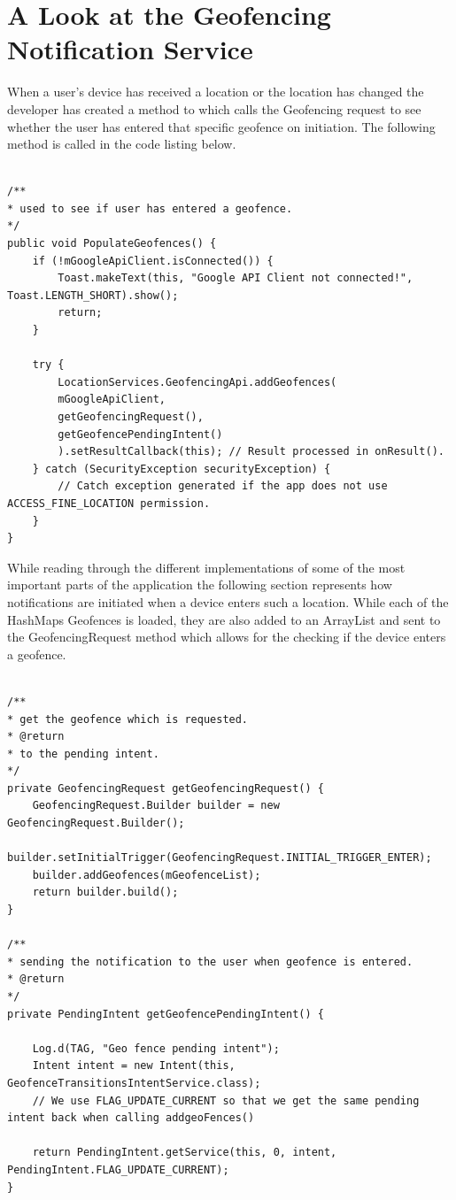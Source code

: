 \section{A Look at the Geofencing Notification Service}
When a user's device has received a location or the location has changed the developer has created a method to which calls the Geofencing request to see whether the user has entered that specific geofence on initiation. The following method is called in the code listing below.
\begin{lstlisting}[style=myCustomMatlabStyle, basicstyle=\small, breaklines, caption=Population of Geofences,captionpos=b]

/**
* used to see if user has entered a geofence.
*/
public void PopulateGeofences() {
    if (!mGoogleApiClient.isConnected()) {
        Toast.makeText(this, "Google API Client not connected!", Toast.LENGTH_SHORT).show();
        return;
    }
    
    try {
        LocationServices.GeofencingApi.addGeofences(
        mGoogleApiClient,
        getGeofencingRequest(),
        getGeofencePendingIntent()
        ).setResultCallback(this); // Result processed in onResult().
    } catch (SecurityException securityException) {
        // Catch exception generated if the app does not use ACCESS_FINE_LOCATION permission.
    }
}
\end{lstlisting}

While reading through the different implementations of some of the most important parts of the application the following section represents how notifications are initiated when a device enters such a location. While each of the HashMaps Geofences is loaded, they are also added to an ArrayList and sent to the GeofencingRequest method which allows for the checking if the device enters a geofence.

\begin{lstlisting}[style=myCustomMatlabStyle, basicstyle=\small, breaklines, caption=Geofence Request and Pending Intent,captionpos=b]

/**
* get the geofence which is requested.
* @return
* to the pending intent.
*/
private GeofencingRequest getGeofencingRequest() {
    GeofencingRequest.Builder builder = new GeofencingRequest.Builder();
    builder.setInitialTrigger(GeofencingRequest.INITIAL_TRIGGER_ENTER);
    builder.addGeofences(mGeofenceList);
    return builder.build();
}

/**
* sending the notification to the user when geofence is entered.
* @return
*/
private PendingIntent getGeofencePendingIntent() {
    
    Log.d(TAG, "Geo fence pending intent");
    Intent intent = new Intent(this, GeofenceTransitionsIntentService.class);
    // We use FLAG_UPDATE_CURRENT so that we get the same pending intent back when calling addgeoFences()
    
    return PendingIntent.getService(this, 0, intent, PendingIntent.FLAG_UPDATE_CURRENT);
}
\end{lstlisting}

